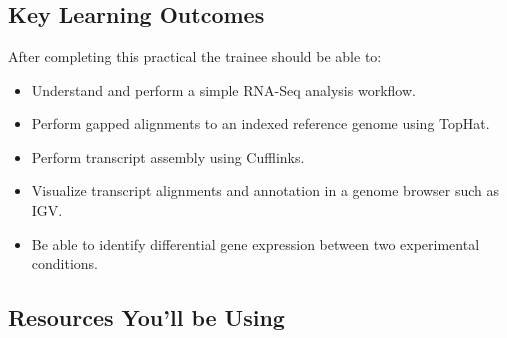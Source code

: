 
\chapter{\moduleTitle}
\newpage

\section{Key Learning Outcomes}

After completing this practical the trainee should be able to:
\begin{itemize}
  \item Understand and perform a simple RNA-Seq analysis workflow.
  \item Perform gapped alignments to an indexed reference genome using TopHat.
  \item Perform transcript assembly using Cufflinks.
  \item Visualize transcript alignments and annotation in a genome browser such as IGV.
  \item Be able to identify differential gene expression between two experimental conditions.
\end{itemize}

\section{Resources You'll be Using}
 
